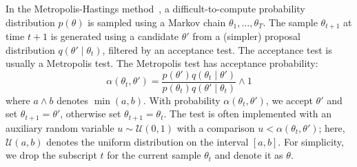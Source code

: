 \documentclass{article}
\begin{document}
In the Metropolis-Hastings method~\cite{gilks1996markov,brooks2011handbook}, a
difficult-to-compute probability distribution $p(\theta)$ is sampled using a
Markov chain $\theta_1,\ldots,\theta_T$. The sample $\theta_{t+1}$ at time $t+1$
is generated using a candidate $\theta'$ from a (simpler) proposal distribution
$q(\theta'\mid \theta_t)$, filtered by an acceptance test. The acceptance test
is usually a Metropolis test. The Metropolis test has acceptance probability:
\begin{equation}\label{eq:traditional}
    \alpha(\theta_t,\theta') = \frac{p(\theta')q(\theta_t \mid \theta')}{p(\theta_t)q(\theta' \mid \theta_t)} \wedge 1
\end{equation}
where $a \wedge b$ denotes $\min(a,b)$.  With probability
$\alpha(\theta_t,\theta')$, we accept $\theta'$ and set $\theta_{t+1} =
\theta'$, otherwise set $\theta_{t+1}=\theta_t$.  The test is often implemented
with an auxiliary random variable $u \sim \mathcal{U}(0,1)$ with a comparison
$u<\alpha(\theta_t,\theta')$; here, $\mathcal{U}(a,b)$ denotes the uniform
distribution on the interval $[a,b]$.  For simplicity, we drop the subscript $t$
for the current sample $\theta_t$ and denote it as $\theta$. 
\end{document}

